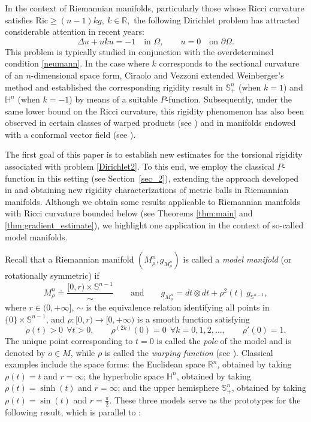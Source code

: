 \documentclass[reqno,11pt]{amsart}
\numberwithin{equation}{section}  %
\begin{document}
In the context of Riemannian manifolds, particularly those whose Ricci curvature satisfies $\mathrm{Ric} \geq (n-1)k g, \ k\in\mathbb{R},$ the following Dirichlet problem has attracted considerable attention in recent years:
\begin{equation}\label{Dirichlet2}
\Delta u + n k u = -1 \quad \text{in } \Omega, 
\qquad 
u = 0 \quad \text{on } \partial \Omega.
\end{equation}
This problem is typically studied in conjunction with the overdetermined condition \eqref{neumann}. In the case where $k$ corresponds to the sectional curvature of an $n$-dimensional space form, Ciraolo and Vezzoni \cite{ciraolo} extended Weinberger's method and established the corresponding rigidity result in $\mathbb{S}^{n}_{+}$ (when $k=1$) and $\mathbb{H}^{n}$ (when $k=-1$) by means of a suitable $P$-function. Subsequently, under the same lower bound on the Ricci curvature, this rigidity phenomenon has also been observed in certain classes of warped products (see \cite{Roncoroni2018, farina2022}) and in manifolds endowed with a conformal vector field (see \cite{freitas2024, andrade2025}).

The first goal of this paper is to establish new estimates for the torsional rigidity associated with problem \eqref{Dirichlet2}. To this end, we employ the classical $P$-function in this setting (see Section~\ref{sec_2}), extending the approach developed in \cite{wang2020} and obtaining new rigidity characterizations of metric balls in Riemannian manifolds. Although we obtain some results applicable to Riemannian manifolds with Ricci curvature bounded below (see Theorems \ref{thm:main} and \ref{thm:gradient_estimate}), we highlight one application in the context of so-called model manifolds.

Recall that a Riemannian manifold $(M_{\rho}^{n},g_{M_{\rho}^{n}})$ is called a \emph{model manifold} (or rotationally symmetric) if
\[
M_{\rho}^{n} \doteq \frac{[0,r)\times\mathbb{S}^{n-1}}{\sim}\qquad\text{and}\qquad 
g_{M_{\rho}^{n}} = dt\otimes dt + \rho^{2}(t)\,g_{\mathbb{S}^{n-1}},
\]
where $r\in(0,+\infty]$, $\sim$ is the equivalence relation identifying all points in $\{0\}\times\mathbb{S}^{n-1}$, and $\rho:[0,r)\to[0,+\infty)$ is a smooth function satisfying
\[
\rho(t)>0\ \ \forall t>0,\qquad \rho^{(2k)}(0)=0\ \ \forall k=0,1,2,\dots,\qquad \rho'(0)=1.
\]
The unique point corresponding to $t=0$ is called the \emph{pole} of the model and is denoted by $o\in M$, while $\rho$ is called the \emph{warping function} (see \cite[Section 1.4.4]{petersen}). Classical examples include the space forms: the Euclidean space $\mathbb{R}^n$, obtained by taking $\rho(t)=t$ and $r=\infty$; the hyperbolic space $\mathbb{H}^n$, obtained by taking $\rho(t)=\sinh(t)$ and $r=\infty$; and the upper hemisphere $\mathbb{S}_{+}^n$, obtained by taking $\rho(t)=\sin(t)$ and $r=\frac{\pi}{2}$. These three models serve as the prototypes for the following result, which is parallel to \cite[Theorem 1.7]{wang2020}:
\end{document}
